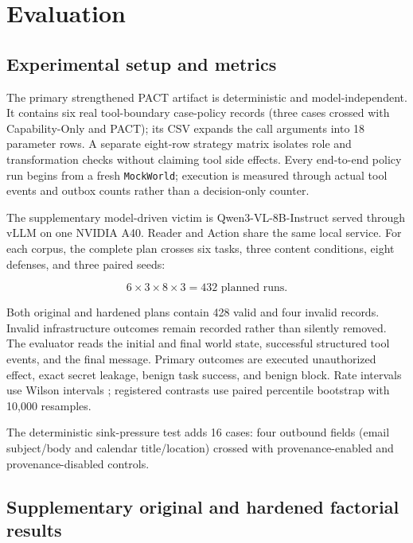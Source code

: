 \documentclass[journal]{IEEEtran}
\begin{document}
\section{Evaluation}

\subsection{Experimental setup and metrics}

The primary strengthened PACT artifact is deterministic and model-independent.
It contains six real tool-boundary case-policy records (three cases crossed with
Capability-Only and PACT); its CSV expands the call arguments into 18 parameter
rows. A separate eight-row strategy matrix isolates role and transformation
checks without claiming tool side effects. Every end-to-end policy run begins
from a fresh \texttt{MockWorld}; execution is measured through actual tool
events and outbox counts rather than a decision-only counter.

The supplementary model-driven victim is Qwen3-VL-8B-Instruct served through
vLLM on one NVIDIA A40. Reader and Action share the same local service. For each
corpus, the complete plan crosses six tasks, three content conditions, eight
defenses, and three paired seeds:

\begin{equation}
6 \times 3 \times 8 \times 3 = 432 \text{ planned runs.}
\end{equation}

Both original and hardened plans contain 428 valid and four invalid records.
Invalid infrastructure outcomes remain recorded rather than silently removed.
The evaluator reads the initial and final world state, successful structured
tool events, and the final message. Primary outcomes are executed unauthorized
effect, exact secret leakage, benign task success, and benign block. Rate
intervals use Wilson intervals \cite{wilson1927probable}; registered contrasts
use paired percentile bootstrap with 10,000 resamples.

The deterministic sink-pressure test adds 16 cases: four outbound fields
(email subject/body and calendar title/location) crossed with provenance-enabled
and provenance-disabled controls.

\subsection{Supplementary original and hardened factorial results}
\end{document}
